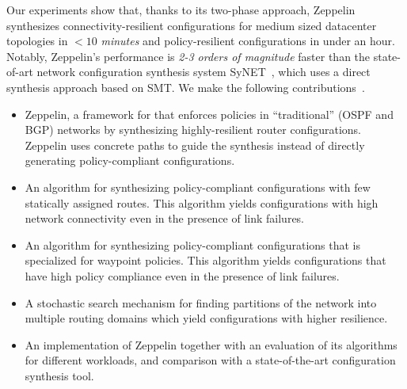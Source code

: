 \documentclass[sigconf]{acmart}
\newcommand{\name}{{\sc Zeppelin}\xspace}
\newcommand{\minisection}[1]{\noindent{\bf #1.}\hspace{1mm}}
\begin{document}
Our experiments show that, thanks to its two-phase approach, \name
synthesizes connectivity-resilient configurations for medium sized
datacenter topologies in $< 10$ {\em minutes} and policy-resilient configurations
in under an hour.  Notably, \name's performance is {\em 2-3 orders of
  magnitude} faster than the state-of-art network configuration
synthesis system SyNET~\cite{synet}, which uses a direct synthesis
approach based on SMT.
\newline
\newline
\minisection{Contributions} We make the following contributions~\cite{zeppelin}.
\begin{itemize}	
    \item \name, a framework for
	that enforces policies in ``traditional'' (OSPF and BGP) networks
	by synthesizing highly-resilient router configurations. 		
	\name  uses concrete
	paths to guide the synthesis  
	instead of directly generating policy-compliant
	configurations.

	\item An algorithm for synthesizing policy-compliant
          configurations with few statically assigned routes. This
          algorithm yields configurations with high network
          connectivity even in the presence of link failures.

	\item An algorithm for synthesizing policy-compliant 		
		 configurations that is specialized for waypoint policies. 
		 This algorithm yields configurations that have
		 high policy compliance even in the presence of link failures. 
	
	\item A stochastic search mechanism for finding 
		partitions of the network into multiple routing domains which
		yield configurations with higher resilience.
	
	\item An implementation of \name together with an evaluation
          of its algorithms for different workloads, and comparison with a state-of-the-art
          configuration synthesis tool.
\end{itemize}



\balance

\end{document}
